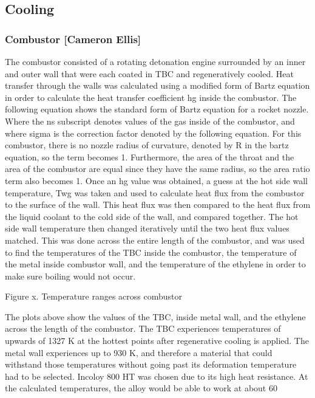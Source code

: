 \subsection{Cooling}
\subsubsection{Combustor [Cameron Ellis]}

            The combustor consisted of a rotating detonation engine surrounded by an inner and outer wall that were each coated in TBC and regeneratively cooled. Heat transfer through the walls was calculated using a modified form of Bartz equation in order to calculate the heat transfer coefficient hg inside the combustor. The following equation shows the standard form of Bartz equation for a rocket nozzle.
            Where the ns subscript denotes values of the gas inside of the combustor, and where sigma is the correction factor denoted by the following equation.
            For this combustor, there is no nozzle radius of curvature, denoted by R in the bartz equation, so the term  becomes 1. Furthermore, the area of the throat and the area of the combustor are equal since they have the same radius, so the area ratio term  also becomes 1. Once an hg value was obtained, a guess at the hot side wall temperature, Twg was taken and used to calculate heat flux from the combustor to the surface of the wall. This heat flux was then compared to the heat flux from the liquid coolant to the cold side of the wall, and compared together. The hot side wall temperature then changed iteratively until the two heat flux values matched. This was done across the entire length of the combustor, and was used to find the temperatures of the TBC inside the combustor, the temperature of the metal inside combustor wall, and the temperature of the ethylene in order to make sure boiling would not occur.


Figure x. Temperature ranges across combustor

            The plots above show the values of the TBC, inside metal wall, and the ethylene across the length of the combustor. The TBC experiences temperatures of upwards of 1327 K at the hottest points after regenerative cooling is applied. The metal wall experiences up to 930 K, and therefore a material that could withstand those temperatures without going past its deformation temperature had to be selected. Incoloy 800 HT was chosen due to its high heat resistance. At the calculated temperatures, the alloy would be able to work at about 60%

